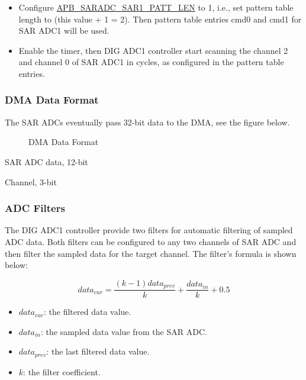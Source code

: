 \documentclass[main\_\_EN.tex]{subfiles}
\begin{document}
\begin{itemize}
    \item Configure \hyperref[fielddesc:APBSARADCSAR1PATTLEN]{APB\_SARADC\_SAR1\_PATT\_LEN} to 1, i.e., set pattern table length to (this value + 1 = 2). Then pattern table entries cmd0 and cmd1 for SAR ADC1 will be used.
    \item Enable the timer, then DIG ADC1 controller start scanning the channel 2 and channel 0 of SAR ADC1 in cycles, as configured in the pattern table entries.
\end{itemize}

\subsubsection{DMA Data Format}

The SAR ADCs eventually pass 32-bit data to the DMA, see the figure below.

\begin{figure}[H]
\centering
{}%
%
%
%
\end{figure}
\vspace{-2em}
\begin{figure}[H]
    \centering
    \caption{DMA Data Format}
    \label{fig:dma-data-format}
\end{figure}
\vspace{-2em}
\begin{regdesc}\begin{reglist}
\item [data] SAR ADC data, 12-bit
\item [ch\_sel] Channel, 3-bit
\end{reglist}\end{regdesc}


\subsubsection{ADC Filters}

The DIG ADC1 controller provide two filters for automatic filtering of sampled ADC data. Both filters can be configured to any two channels of SAR ADC and then filter the sampled data for the target channel. The filter's formula is shown below:

\[data_{cur} = \frac{(k-1)data_{prev}}{k}+\frac{data_{in}}{k}+0.5\]

\begin{itemize}
    \item \(data_{cur}\): the filtered data value.
    \item \(data_{in}\): the sampled data value from the SAR ADC.
    \item \(data_{prev}\): the last filtered data value.
    \item \(k\): the filter coefficient.
\end{itemize}
\end{document}
